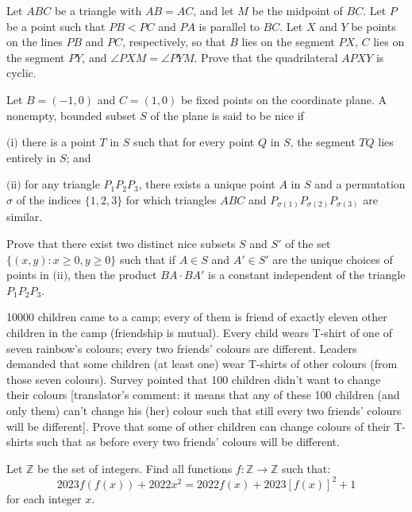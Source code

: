 \documentclass[11pt]{scrartcl}
\begin{document}
\begin{problem}[883811987981100]
Let $ABC$ be a triangle with $AB=AC$, and let $M$ be the midpoint of $BC$. Let $P$ be a point such that $PB<PC$ and $PA$ is parallel to $BC$. Let $X$ and $Y$ be points on the lines $PB$ and $PC$, respectively, so that $B$ lies on the segment $PX$, $C$ lies on the segment $PY$, and $\angle PXM=\angle PYM$. Prove that the quadrilateral $APXY$ is cyclic.
\end{problem}
\begin{problem}[357249331453104]
Let $B = (-1, 0)$ and $C = (1, 0)$ be fixed points on the coordinate plane. A nonempty, bounded subset $S$ of the plane is said to be nice if

$\text{(i)}$ there is a point $T$ in $S$ such that for every point $Q$ in $S$, the segment $TQ$ lies entirely in $S$; and

$\text{(ii)}$ for any triangle $P_1P_2P_3$, there exists a unique point $A$ in $S$ and a permutation $\sigma$ of the indices $\{1, 2, 3\}$ for which triangles $ABC$ and $P_{\sigma(1)}P_{\sigma(2)}P_{\sigma(3)}$ are similar.

Prove that there exist two distinct nice subsets $S$ and $S'$ of the set $\{(x, y) : x \geq 0, y \geq 0\}$ such that if $A \in S$ and $A' \in S'$ are the unique choices of points in $\text{(ii)}$, then the product $BA \cdot BA'$ is a constant independent of the triangle $P_1P_2P_3$.
\end{problem}
\begin{problem}[4527883777563937913]
10000 children came to a camp; every of them is friend of exactly eleven other children in the camp (friendship is mutual). Every child wears T-shirt of one of seven rainbow's colours; every two friends' colours are different. Leaders demanded that some children (at least one) wear T-shirts of other colours (from those seven colours). Survey pointed that 100 children didn't want to change their colours [translator's comment: it means that any of these 100 children (and only them) can't change his (her) colour such that still every two friends' colours will be different]. Prove that some of other children can change colours of their T-shirts such that as before every two friends' colours will be different.
\end{problem}
\begin{problem}[834743022162424]
Let $\mathbb{Z}$ be the set of integers. Find all functions $f:\mathbb{Z}\rightarrow\mathbb{Z}$ such that:
$$2023f(f(x))+2022x^2=2022f(x)+2023[f(x)]^2+1$$for each integer $x$.
\end{problem}
\end{document}
